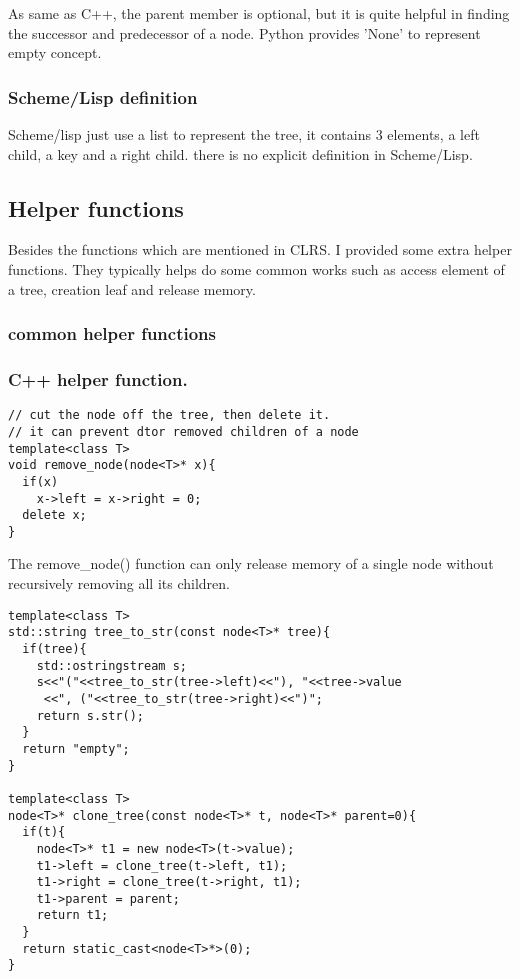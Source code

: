 \documentclass{article}
\begin{document}
As same as C++, the parent member is optional, but it is quite helpful
in finding the successor and predecessor of a node. Python provides
'None' to represent empty concept.

\subsubsection*{Scheme/Lisp definition}
Scheme/lisp just use a list to represent the tree, it contains 3 elements,
a left child, a key and a right child. there is no explicit definition
in Scheme/Lisp.

\subsection{Helper functions} \label{helper-fun}

Besides the functions which are mentioned in CLRS\cite{CLRS}. I provided some
extra helper functions. They typically helps do some common works such as 
access element of a tree, creation leaf and release memory.

\subsubsection{common helper functions}

\subsubsection*{C++ helper function.}
\lstset{language=C++}
\begin{lstlisting}
// cut the node off the tree, then delete it.
// it can prevent dtor removed children of a node
template<class T>
void remove_node(node<T>* x){
  if(x)
    x->left = x->right = 0;
  delete x;
}
\end{lstlisting}

The remove\_node() function can only release memory of a single node without recursively
removing all its children. 

\begin{lstlisting}
template<class T>
std::string tree_to_str(const node<T>* tree){
  if(tree){
    std::ostringstream s;
    s<<"("<<tree_to_str(tree->left)<<"), "<<tree->value
     <<", ("<<tree_to_str(tree->right)<<")";
    return s.str();
  }
  return "empty";
}

template<class T>
node<T>* clone_tree(const node<T>* t, node<T>* parent=0){
  if(t){
    node<T>* t1 = new node<T>(t->value);
    t1->left = clone_tree(t->left, t1);
    t1->right = clone_tree(t->right, t1);
    t1->parent = parent;
    return t1;
  }
  return static_cast<node<T>*>(0);
}
\end{lstlisting}
\end{document}
